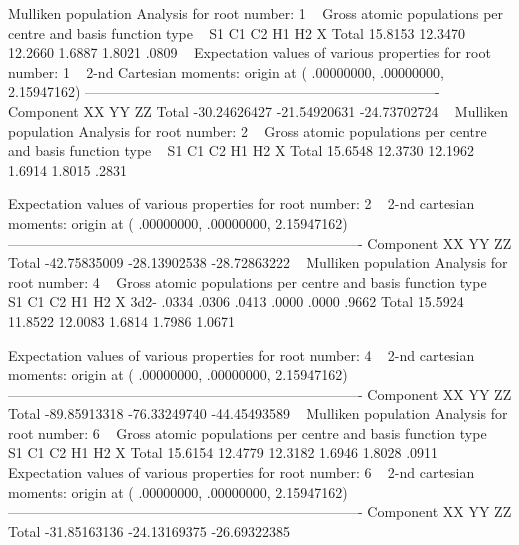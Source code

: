 \begin{sourcelisting}
      Mulliken population Analysis for root number: 1
~ 
      Gross atomic populations per centre and basis function type
~
               S1      C1      C2      H1      H2      X   
      Total 15.8153 12.3470 12.2660  1.6887  1.8021   .0809
~
      Expectation values of various properties for root number: 1
~
  2-nd Cartesian moments: origin at (   .00000000,   .00000000,  2.15947162)
 ----------------------------------------------------------------------------
 Component                            XX              YY              ZZ  
 Total                      -30.24626427    -21.54920631    -24.73702724
~
      Mulliken population Analysis for root number: 2
~
      Gross atomic populations per centre and basis function type
~
               S1      C1      C2      H1      H2      X   
      Total 15.6548 12.3730 12.1962  1.6914  1.8015   .2831

      Expectation values of various properties for root number: 2
~
  2-nd cartesian moments: origin at (   .00000000,   .00000000,  2.15947162)
 ----------------------------------------------------------------------------
 Component                            XX              YY              ZZ
 Total                      -42.75835009    -28.13902538    -28.72863222
~
      Mulliken population Analysis for root number: 4
~ 
      Gross atomic populations per centre and basis function type
~
               S1      C1      C2      H1      H2      X   
      3d2-    .0334   .0306   .0413   .0000   .0000   .9662
      Total 15.5924 11.8522 12.0083  1.6814  1.7986  1.0671

      Expectation values of various properties for root number: 4
~
  2-nd cartesian moments: origin at (   .00000000,   .00000000,  2.15947162)
 ----------------------------------------------------------------------------
 Component                            XX              YY              ZZ
 Total                      -89.85913318    -76.33249740    -44.45493589
~
      Mulliken population Analysis for root number: 6
~ 
      Gross atomic populations per centre and basis function type
~
               S1      C1      C2      H1      H2      X   
      Total 15.6154 12.4779 12.3182  1.6946  1.8028   .0911
~
      Expectation values of various properties for root number: 6
~
  2-nd cartesian moments: origin at (   .00000000,   .00000000,  2.15947162)
 ----------------------------------------------------------------------------
 Component                            XX              YY              ZZ 
 Total                      -31.85163136    -24.13169375    -26.69322385
\end{sourcelisting}

